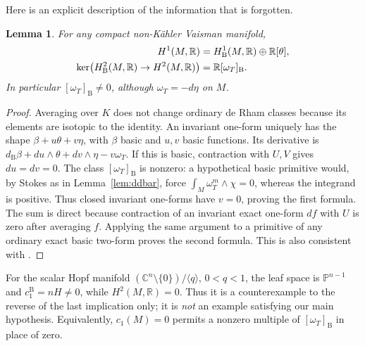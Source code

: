 \documentclass[12pt]{amsart}
\newtheorem{lem}[thm]{Lemma}
\theoremstyle{definition}
\theoremstyle{remark}
\numberwithin{equation}{section}
\newcommand{\R}{\mathbb{R}}
\newcommand{\C}{\mathbb{C}}
\newcommand{\mP}{\mathbb{P}}
\newcommand{\bas}{\mathrm{B}}
\newcommand{\wt}{\omega_{T}}
\begin{document}
Here is an explicit description of the information that is forgotten.
\begin{lem}\label{lem:lowdegree}
For any compact non-K\"ahler Vaisman manifold,
\begin{align}\label{eq:lowdegree}
H^1(M,\R)&=H^1_{\bas}(M,\R)\oplus\R[\theta],\\
\ker\bigl(H^2_{\bas}(M,\R)\to H^2(M,\R)\bigr)&=\R[\wt]_{\bas}.
\notag
\end{align}
In particular $[\wt]_{\bas}\ne0$, although $\wt=-d\eta$ on $M$.
\end{lem}
\begin{proof}
Averaging over $K$ does not change ordinary de Rham classes because its
elements are isotopic to the identity. An invariant one-form uniquely
has the shape $\beta+u\theta+v\eta$, with $\beta$ basic and $u,v$ basic
functions. Its derivative is
$d_{\bas}\beta+du\wedge\theta+dv\wedge\eta-v\wt$.
If this is basic, contraction with $U,V$ gives $du=dv=0$.
The class $[\wt]_{\bas}$ is nonzero: a hypothetical basic primitive
would, by Stokes as in Lemma~\ref{lem:ddbar}, force
$\int_M\wt^m\wedge\chi=0$, whereas the integrand is positive.
Thus closed invariant one-forms have $v=0$, proving the first formula.
The sum is direct because contraction of an invariant exact one-form
$df$ with $U$ is zero after averaging $f$. Applying the same argument to
a primitive of any ordinary exact basic two-form proves the second
formula. This is also consistent with \cite[Sections 3--5]{IO}.
\end{proof}

For the scalar Hopf manifold
$(\C^n\setminus\{0\})/\langle q\rangle$, $0<q<1$, the leaf space is
$\mP^{n-1}$ and $c_1^{\bas}=nH\ne0$, while $H^2(M,\R)=0$.
Thus it is a counterexample to the reverse of the last implication only;
it is \emph{not} an example satisfying our main hypothesis.
Equivalently, $c_1(M)=0$ permits a nonzero multiple of
$[\wt]_{\bas}$ in place of zero.
\end{document}
